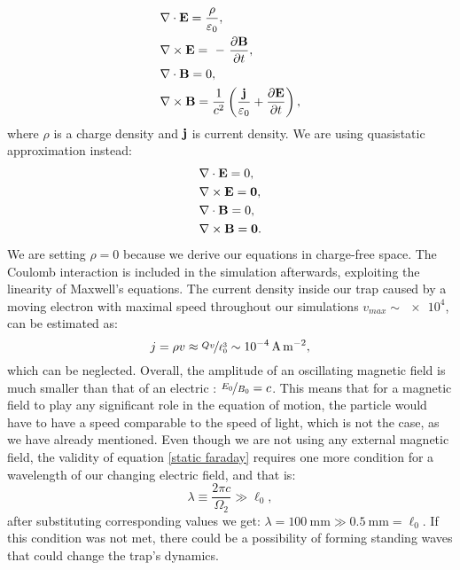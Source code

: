 \begin{description}
\begin{subequations}
\begin{align}
	\label{full gauss}
	&\nabla \cdot \vb{E} = \dfrac{\rho}{\varepsilon_0}, \\
	\label{full faraday}
	&\nabla \times \vb{E} = \minus\dfrac{\partial\vb{B}}{\partial t}, \\
	\label{full magnet}
	&\nabla \cdot \vb{B} = 0, \\
	\label{full ampere}
	&\nabla \times \vb{B} = \dfrac{1}{c^2} \left( \dfrac{\vb{j}}{\varepsilon_0} +  \dfrac{\partial\vb{E}}{\partial t} \right),
\end{align}
\end{subequations}
where $\rho$ is a charge density and $\vb{j}$ is current density. We are using quasistatic approximation instead:
\begin{subequations}
\label{static maxwell}
\begin{align}
	\label{static gauss}
	&\nabla \cdot \vb{E} = 0, \\
	\label{static faraday}
	&\nabla \times \vb{E} = \vb{0}, \\
	\label{static magnet}
	&\nabla \cdot \vb{B} = 0, \\
	\label{static ampere}
	&\nabla \times \vb{B} = \vb{0}.
\end{align}
\end{subequations}
We are setting $\rho=0$ because we derive our equations in charge-free space. The Coulomb interaction is included in the simulation afterwards, exploiting the linearity of Maxwell's equations. The current density inside our trap caused by a moving electron with maximal speed throughout our simulations $v_{max} \sim \num{e+4}$, can be estimated as:
\begin{equation}
	j = \rho v \approx \nicefrac{Q v}{\ell_0^3} \sim \SI{e-4}{A.m^{-2}},
\end{equation}
which can be neglected. Overall, the amplitude of an oscillating magnetic field is much smaller than that of an electric \cite{Friedman_1982}: $\nicefrac{E_0}{B_0} = c$. This means that for a magnetic field to play any significant role in the equation of motion, the particle would have to have a speed comparable to the speed of light, which is not the case, as we have already mentioned. Even though we are not using any external magnetic field, the validity of equation \eqref{static faraday} requires one more condition \cite{Friedman_1982} for a wavelength of our changing electric field, and that is:
\begin{equation}
	\lambda \equiv \dfrac{2\pi c}{\Omega_2} \gg \ell_0,
\end{equation}
after substituting corresponding values we get: $\lambda = \SI{100}{\mm} \gg \SI{0.5}{\mm} = \ell_0$. If this condition was not met, there could be a possibility of forming standing waves that could change the trap's dynamics. 
  

\end{description}
